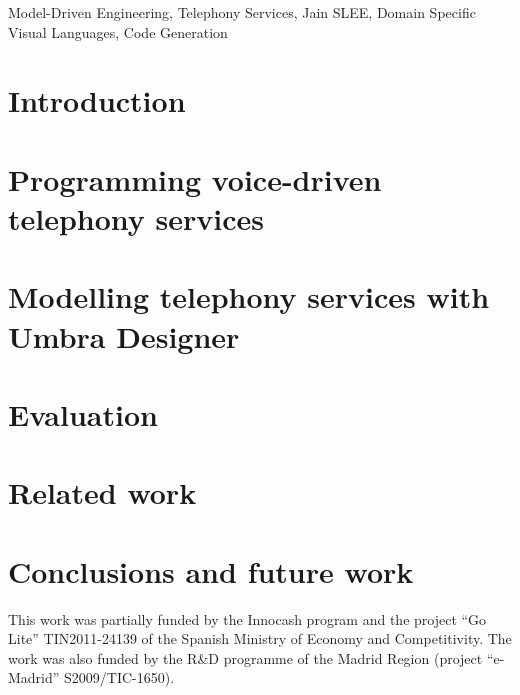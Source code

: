 \documentclass{llncs}
\begin{document}
\begin{keywords} 
Model-Driven Engineering, 
Telephony Services, 
Jain SLEE, 
Domain Specific Visual Languages, 
Code Generation\end{keywords}

\section{Introduction}\label{sec:introduction}


\section{Programming voice-driven telephony services}\label{sec:api}


\section{Modelling telephony services with Umbra Designer}\label{sec:designer}


\section{Evaluation}\label{sec:evaluation}


\section{Related work}\label{sec:related}


\section{Conclusions and future work}\label{sec:conclusions}


 This work was partially funded by the Innocash program and the project ``Go Lite'' TIN2011-24139
of the Spanish Ministry of Economy and Competitivity. The work was also funded by the R\&D programme of the Madrid 
Region (project ``e-Madrid'' S2009/TIC-1650).




\end{document}
